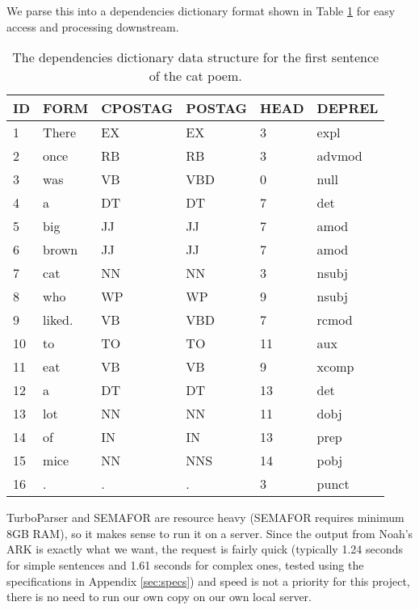 We parse this into a dependencies dictionary format shown in Table \ref{tab:DepDict} for easy access and processing downstream.

\begin{table}
\centering
    \begin{tabular}{|l|l|l|l|l|l|}
    \hline
    ID & FORM   & CPOSTAG & POSTAG & HEAD & DEPREL \\ \hline
    1  & There  & EX      & EX     & 3    & expl   \\
    2  & once   & RB      & RB     & 3    & advmod \\
    3  & was    & VB      & VBD    & 0    & null   \\
    4  & a      & DT      & DT     & 7    & det    \\
    5  & big    & JJ      & JJ     & 7    & amod   \\
    6  & brown  & JJ      & JJ     & 7    & amod   \\
    7  & cat    & NN      & NN     & 3    & nsubj  \\
    8  & who    & WP      & WP     & 9    & nsubj  \\
    9  & liked. & VB      & VBD    & 7    & rcmod  \\
    10 & to     & TO      & TO     & 11   & aux    \\
    11 & eat    & VB      & VB     & 9    & xcomp  \\
    12 & a      & DT      & DT     & 13   & det    \\
    13 & lot    & NN      & NN     & 11   & dobj   \\
    14 & of     & IN      & IN     & 13   & prep   \\
    15 & mice   & NN      & NNS    & 14   & pobj   \\
    16 & .      & .       & .      & 3    & punct  \\ \hline
    \end{tabular}
\caption{The dependencies dictionary data structure for the first sentence of the cat poem.}
\label{tab:DepDict}
\end{table}

TurboParser and SEMAFOR are resource heavy (SEMAFOR requires minimum 8GB RAM), so it makes sense to run it on a server. Since the output from Noah's ARK is exactly what we want, the request is fairly quick (typically 1.24 seconds for simple sentences and 1.61 seconds for complex ones, tested using the specifications in Appendix \ref{sec:specs}) and speed is not a priority for this project, there is no need to run our own copy on our own local server.

